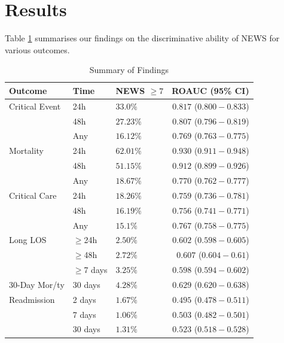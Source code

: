 \documentclass[10pt,journal, compsoc]{IEEEtran}
\begin{document}
\section{Results}
Table \ref{tab:result_summary} summarises our findings on the discriminative ability of NEWS for various outcomes.
\begin{table}[!t]
    \renewcommand{\arraystretch}{1.3}
    \centering
    \caption{Summary of Findings}
    \label{tab:result_summary}
    \begin{tabular}{lllr}
        \toprule
        Outcome        & Time         & NEWS $\geq 7$ & ROAUC (95\% CI)              \\
        \midrule
        Critical Event & 24h          & $33.0\%$      & $\bm{0.817}$ ($0.800-0.833$) \\
                       & 48h          & $27.23\%$     & $0.807$ ($0.796-0.819$)      \\
                       & Any          & $16.12\%$     & $0.769$ ($0.763-0.775$)      \\
        \hline
        Mortality      & 24h          & $62.01\%$     & $\bm{0.930}$ ($0.911-0.948$) \\
                       & 48h          & $51.15\%$     & $0.912$ ($0.899-0.926$)      \\
                       & Any          & $18.67\%$     & $0.770$ ($0.762-0.777$)      \\
        \hline
        Critical Care  & 24h          & $18.26\%$     & $\bm{0.759}$ ($0.736-0.781$) \\
                       & 48h          & $16.19\%$     & $0.756$ ($0.741-0.771$)      \\
                       & Any          & $15.1\%$      & $0.767$ ($0.758-0.775$)      \\
        \hline
        Long LOS       & $\geq$24h    & $2.50\%$      & $0.602$ ($0.598-0.605$)      \\
                       & $\geq$48h    & $2.72\%$      & $\bm{0.607}$ ($0.604-0.61$)  \\
                       & $\geq$7 days & $3.25\%$      & $0.598$ ($0.594-0.602$)      \\
        \hline
        30-Day Mor/ty  & 30 days      & $4.28\%$      & $0.629$ ($0.620-0.638$)      \\
        \hline
        Readmission    & 2 days       & $1.67\%$      & $0.495$ ($0.478-0.511$)      \\
                       & 7 days       & $1.06\%$      & $0.503$ ($0.482-0.501$)      \\
                       & 30 days      & $1.31\%$      & $0.523$ ($0.518-0.528$)      \\
        \bottomrule
    \end{tabular}
\end{table}
\end{document}
